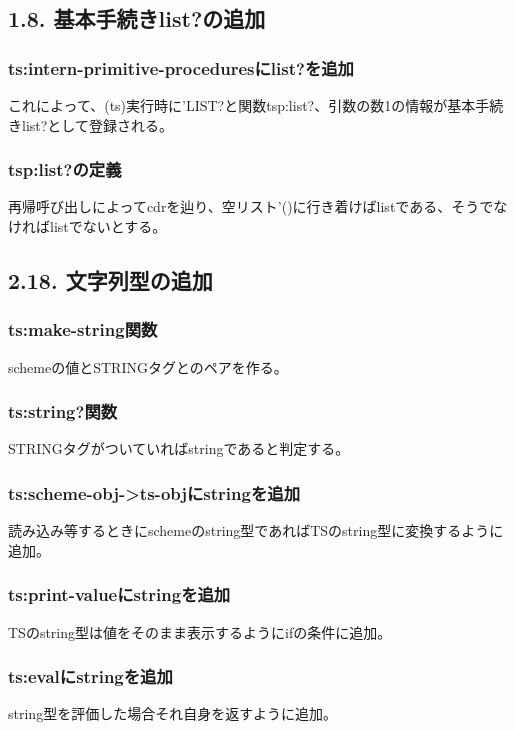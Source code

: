 \documentclass{jarticle}
\begin{document}
\subsection{1.8. 基本手続きlist?の追加}
\subsubsection{ts:intern-primitive-proceduresにlist?を追加}
これによって、(ts)実行時に'LIST?と関数tsp:list?、引数の数1の情報が基本手続きlist?として登録される。\par
\subsubsection{tsp:list?の定義}
再帰呼び出しによってcdrを辿り、空リスト'()に行き着けばlistである、そうでなければlistでないとする。\par

\subsection{2.18. 文字列型の追加}
\subsubsection{ts:make-string関数}
schemeの値とSTRINGタグとのペアを作る。\par
\subsubsection{ts:string?関数}
STRINGタグがついていればstringであると判定する。\par
\subsubsection{ts:scheme-obj->ts-objにstringを追加}
読み込み等するときにschemeのstring型であればTSのstring型に変換するように追加。\par
\subsubsection{ts:print-valueにstringを追加}
TSのstring型は値をそのまま表示するようにifの条件に追加。\par
\subsubsection{ts:evalにstringを追加}
string型を評価した場合それ自身を返すように追加。\par
\end{document}
